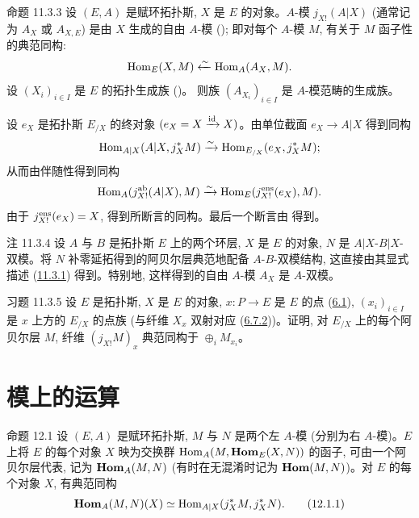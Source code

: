 \begin{enonce*}{命题 11.3.3}
设 $(E,A)$ 是赋环拓扑斯, $X$ 是 $E$ 的对象。$A$-模 $j_{X!}(A|X)$ (通常记为 $A_X$ 或 $A_{X,E}$) 是由 $X$ 生成的自由 $A$-模 {\rm ()}; 即对每个 $A$-模 $M$, 有关于 $M$ 函子性的典范同构:
$$
\operatorname{Hom}_E(X,M)\xleftarrow{\sim} \operatorname{Hom}_A (A_X, M){}.
$$
设 $(X_i)_{i\in I}$ 是 $E$ 的拓扑生成族 {\rm ()。} 则族 $(A_{X_i})_{i\in I}$ 是 $A$-模范畴的生成族。
\end{enonce*}

设 $e_X$ 是拓扑斯 $E_{/X}$ 的终对象 $(e_X=X\xrightarrow{\operatorname{id}}X)$。由单位截面 $e_X\rightarrow A|X$ 得到\pageoriginale 同构
$$
\operatorname{Hom}_{A|X}(A|X,j^{\ast}_XM)\xrightarrow{\sim}
\operatorname{Hom}_{E_{/X}}(e_X,j^{\ast}_XM){};
$$
从而由伴随性得到同构
$$
\operatorname{Hom}_A(j^{\operatorname{ab}}_{X!}(A|X),
M)\xrightarrow{\sim}\operatorname{Hom}_E(j^{\operatorname{ens}}_{X!}(e_X),M){}.
$$
由于 $j^{\operatorname{ens}}_{X!}(e_X)=X$, 得到所断言的同构。最后一个断言由  得到。

\begin{enonce*}[remark]{注 11.3.4}
设 $A$ 与 $B$ 是拓扑斯 $E$ 上的两个环层, $X$ 是 $E$ 的对象, $N$ 是 $A|X$-$B| X$-双模。将 $N$ 补零延拓得到的阿贝尔层典范地配备 $A$-$B$-双模结构, 这直接由其显式描述 (\hyperref[IV.prop11.3.1]{11.3.1}) 得到。特别地, 这样得到的自由 $A$-模 $A_X$ 是 $A$-双模。
\end{enonce*}

\begin{enonce*}[remark]{习题 11.3.5}
设 $E$ 是拓扑斯, $X$ 是 $E$ 的对象, $x:P\rightarrow E$ 是 $E$ 的点 (\hyperref[IV.def6.1]{6.1}), $(x_i)_{i\in I}$ 是 $x$ 上方的 $E_{/X}$ 的点族 (与纤维 $X_x$ 双射对应 (\hyperref[IV.eq6.7.2]{6.7.2}))。证明, 对 $E_{/X}$ 上的每个阿贝尔层 $M$, 纤维 $(j_{X!}M)_x$ 典范同构于 $\oplus_i M_{x_i}$。
\end{enonce*}


\section{模上的运算}

\begin{enonce*}{命题 12.1}
设 $(E,A)$ 是赋环拓扑斯, $M$ 与 $N$ 是两个左 $A$-模 (分别为右 $A$-模)。$E$ 上将 $E$ 的每个对象 $X$ 映为交换群 $\operatorname{Hom}_A(M,\operatorname{\mathbf{Hom}}_E(X,N))$ 的函子, 可由一个阿贝尔层代表, 记为 $\operatorname{\mathbf{Hom}}_A(M,N)$ (有时在无混淆时记为 $\operatorname{\mathbf{Hom}}(M,N)$)。对 $E$ 的每个对象 $X$, 有典范同构
\begin{equation*}
\operatorname{\mathbf{Hom}}_A(M,N)(X)\simeq \operatorname{Hom}_{A| X}(j^{\ast}_XM,
j^{\ast}_XN){}.\tag{12.1.1}
\end{equation*}
\end{enonce*}

